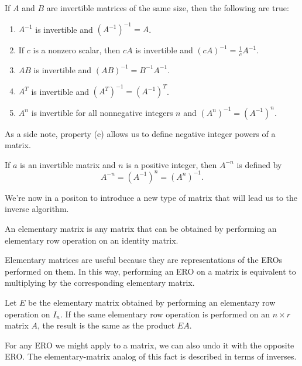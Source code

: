 \documentclass[../m73main.tex]{chapters}
\begin{document}
\begin{theorem}
	If $A$ and $B$ are invertible matrices of the same size, then the following are true:
	\begin{enumerate}[label=(\alph*)]
		\item $A^{-1}$ is invertible and $(A^{-1})^{-1} = A$.
		\item If $c$ is a nonzero scalar, then $cA$ is invertible and $(cA)^{-1} = \frac{1}{c}A^{-1}$.
		\item $AB$ is invertible and $(AB)^{-1} = B^{-1}A^{-1}$.
		\item $A^T$ is invertible and $(A^T)^{-1} = (A^{-1})^T$.
		\item $A^n$ is invertible for all nonnegative integers $n$ and $(A^n)^{-1} = (A^{-1})^n$.
	\end{enumerate}
\end{theorem}

As a side note, property (e) allows us to define negative integer powers of a matrix.

\begin{definition}
	If $a$ is an invertible matrix and $n$ is a positive integer, then $A^{-n}$ is defined by
	\[ A^{-n} = (A^{-1})^n = (A^n)^{-1}. \]
\end{definition}

We're now in a positon to introduce a new type of matrix that will lead us to the inverse algorithm.

\begin{definition}
	An elementary matrix is any matrix that can be obtained by performing an elementary row operation on an identity matrix.
\end{definition}

Elementary matrices are useful because they are representations of the EROs performed on them.
In this way, performing an ERO on a matrix is equivalent to multiplying by the corresponding elementary matrix.

\begin{theorem}
	Let $E$ be the elementary matrix obtained by performing an elementary row operation on $I_n$.
	If the same elementary row operation is performed on an $n\times r$ matrix $A$, the result is the same as the product $EA$.
\end{theorem}

For any ERO we might apply to a matrix, we can also undo it with the opposite ERO.
The elementary-matrix analog of this fact is described in terms of inverses.
\end{document}
